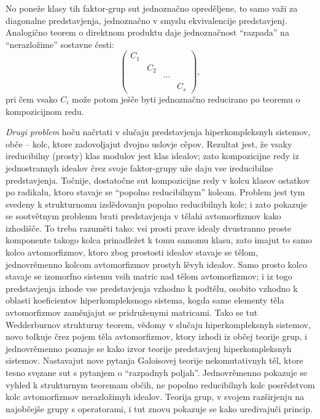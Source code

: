 \documentclass[11pt]{article}
\begin{document}
No poneže klasy tih faktor-grup sut jednoznačno opreděljene, to samo važi za diagonalne predstavjenja, jednoznačno v smyslu ekvivalencije predstavjenj. Analogično teorem o direktnom produktu daje jednoznačnost “razpada” na “nerazložime” sostavne česti:
\[
\begin{pmatrix}
C_1&&&\\
&C_2&&\\
&&\cdots&\\
&&&C_s
\end{pmatrix},
\]
pri čem vsako $C_i$ može potom ješče byti jednoznačno reducirano po teoremu o kompozicijnom redu.

\emph{Drugi problem} hoču načrtati v slučaju predstavjenja hiperkompleksnyh sistemov, obče -- kolc, ktore zadovoljajut dvojno uslovje cěpov. Rezultat jest, že vsaky ireducibilny (prosty) klas modulov jest klas idealov; zato kompozicijne redy iz jednostrannyh idealov črez svoje faktor-grupy uže daju vse ireducibilne predstavjenja. Točnije, dostatočne sut kompozicijne redy v kolcu klasov ostatkov po radikalu, ktoro stavaje se “popolno reducibilnym” kolcom. Problem jest tym svedeny k strukturnomu izslědovanju popolno reducibilnyh kolc; i zato pokazuje se sootvětnym problemu brati predstavjenja v tělahi avtomorfizmov kako izhodišče. To treba razuměti tako: vsi prosti prave idealy dvustranno proste komponente takogo kolca prinadležet k tomu samomu klasu, zato imajut to samo kolco avtomorfizmov, ktoro zbog prostosti idealov stavaje se tělom, jednovrěmenno kolcom avtomorfizmov prostyh lěvyh idealov. Samo prosto kolco stavaje se izomorfno sistemu vsih matric nad tělom avtomorfizmov; i iz togo predstavjenja izhode vse predstavjenja vzhodno k podtělu, osobito vzhodno k oblasti koeficientov hiperkompleksnogo sistema, kogda same elementy těla avtomorfizmov zaměnjajut se pridruženymi matricami. Tako se tut Wedderburnov strukturny teorem, vědomy v slučaju hiperkompleksnyh sistemov, novo tolkuje črez pojem těla avtomorfizmov, ktory izhodi iz občej teorije grup, i jednovrěmenno poznaje se kako izvor teorije predstavjenj hiperkompleksnyh sistemov. Nastavajut nove pytanja Galoisovej teorije nekomutativnyh těl, ktore tesno svęzane sut s pytanjem o “razpadnyh poljah”. Jednovrěmenno pokazuje se vyhled k strukturnym teoremam občih, ne popolno reducibilnyh kolc posrědstvom kolc avtomorfizmov nerazložimyh idealov. Teorija grup, v svojem razširjenju na najobčejše grupy s operatorami, i tut znovu pokazuje se kako uredivajuči princip.
\end{document}
